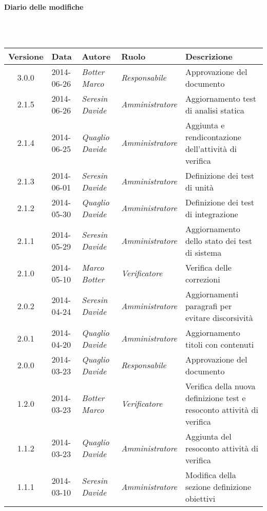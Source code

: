 \noindent\begin{Large}\textbf{Diario delle modifiche}\end{Large}\\
\\
\begin{small}
\begin{tabular}{|c|p{1.8cm}|p{2.8cm}|p{2.8cm}|p{3.5cm}|}
\hline
Versione & Data & Autore & Ruolo & Descrizione \\
\hline
\hline
3.0.0 & 2014-06-26 & 
\textit{Botter Marco} &
\textit{Responsabile} &  Approvazione del documento\\
\hline
2.1.5 & 2014-06-26 & 
\textit{Seresin Davide} &
\textit{Amministratore} &  Aggiornamento test di analisi statica\\
\hline
2.1.4 & 2014-06-25 & 
\textit{Quaglio Davide} &
\textit{Amministratore} &  Aggiunta e rendicontazione dell'attività di verifica\\
\hline
2.1.3 & 2014-06-01 & 
\textit{Seresin Davide} &
\textit{Amministratore} &  Definizione dei test di unità\\
\hline
2.1.2 & 2014-05-30 & 
\textit{Quaglio Davide} &
\textit{Amministratore} &  Definizione dei test di integrazione\\
\hline
2.1.1 & 2014-05-29 & 
\textit{Seresin Davide} &
\textit{Amministratore} &  Aggiornamento dello stato dei test di sistema\\
\hline
2.1.0 & 2014-05-10 & 
\textit{Marco Botter} &
\textit{Verificatore} &  Verifica delle correzioni\\
\hline
2.0.2 & 2014-04-24 & 
\textit{Seresin Davide} &
\textit{Amministratore} &  Aggiornamenti paragrafi per evitare discorsività\\
\hline
2.0.1 & 2014-04-20 & 
\textit{Quaglio Davide} &
\textit{Amministratore} &  Aggiornamento titoli con contenuti\\
\hline
2.0.0 & 2014-03-23 & 
\textit{Quaglio Davide} &
\textit{Responsabile} &  Approvazione del documento\\
\hline
1.2.0 & 2014-03-23 & 
\textit{Botter Marco} &
\textit{Verificatore} &  Verifica della nuova definizione test e resoconto attività di verifica\\
\hline
1.1.2 & 2014-03-23 & 
\textit{Quaglio Davide} &
\textit{Amministratore} &  Aggiunta del resoconto attività di verifica\\
\hline
1.1.1 & 2014-03-10 & 
\textit{Seresin Davide} &
\textit{Amministratore} &  Modifica della sezione definizione obiettivi\\

\end{tabular}
\end{small}

